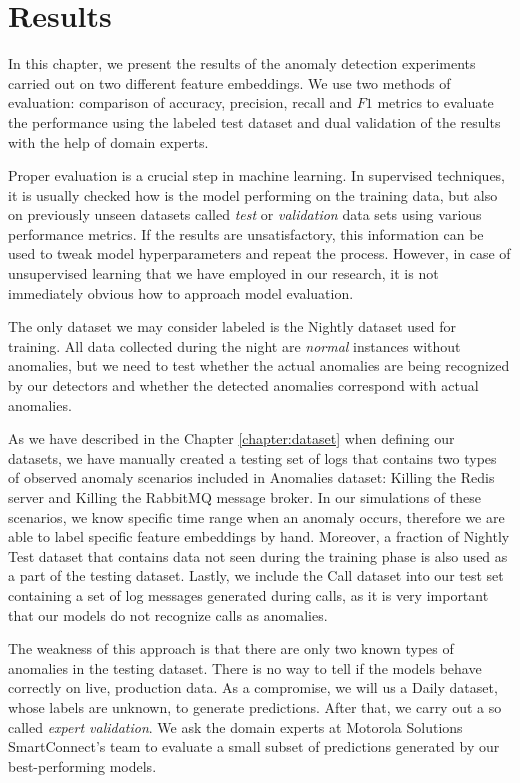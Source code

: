 \chapter{Results}

In this chapter, we present the results of the anomaly detection experiments carried out on two different feature embeddings. We use two methods of evaluation: comparison of accuracy, precision, recall and $F1$ metrics to evaluate the performance using the labeled test dataset and dual validation of the results with the help of domain experts.


Proper evaluation is a crucial step in machine learning. In supervised techniques, it is usually checked how is the model performing on the training data, but also on previously unseen datasets called \textit{test} or \textit{validation} data sets using various performance metrics. If the results are unsatisfactory, this information can be used to tweak model hyperparameters and repeat the process. However, in case of unsupervised learning that we have employed in our research, it is not immediately obvious how to approach model evaluation. 

The only dataset we may consider labeled is the Nightly dataset used for training. All data collected during the night are \textit{normal} instances without anomalies, but we need to test whether the actual anomalies are being recognized by our detectors and whether the detected anomalies correspond with actual anomalies. 

As we have described in the Chapter \ref{chapter:dataset} when defining our datasets, we have manually created a testing set of logs that contains two types of observed anomaly scenarios included in Anomalies dataset: Killing the Redis server and Killing the RabbitMQ message broker. In our simulations of these scenarios, we know specific time range when an anomaly occurs, therefore we are able to label specific feature embeddings by hand. Moreover, a fraction of Nightly Test dataset that contains data not seen during the training phase is also used as a part of the testing dataset. Lastly, we include the Call dataset into our test set containing a set of log messages generated during calls, as it is very important that our models do not recognize calls as anomalies.

The weakness of this approach is that there are only two known types of anomalies in the testing dataset. There is no way to tell if the models behave correctly on live, production data. As a compromise, we will us a Daily dataset, whose labels are unknown, to generate predictions. After that, we carry out a so called \textit{expert validation}. We ask the domain experts at Motorola Solutions SmartConnect's team to evaluate a small subset of predictions generated by our best-performing models. 


